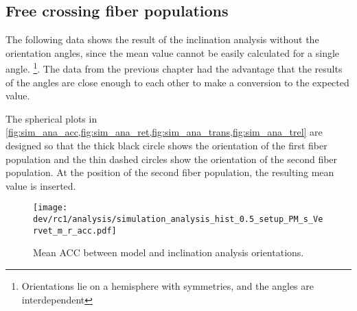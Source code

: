 \subsection{Free crossing fiber populations}
\label{sec:resFreeCross}
%
The following data shows the result of the inclination analysis without the orientation angles, since the mean value cannot be easily calculated for a single angle. \footnote{Orientations lie on a hemisphere with symmetries, and the angles are interdependent}.
The data from the previous chapter had the advantage that the results of the angles are close enough to each other to make a conversion to the expected value.
\par
%
The spherical plots in \cref{fig:sim_ana_acc,fig:sim_ana_ret,fig:sim_ana_trans,fig:sim_ana_trel} are designed so that the thick black circle shows the orientation of the first fiber population and the thin dashed circles show the orientation of the second fiber population.
At the position of the second fiber population, the resulting mean value is inserted.
%
%
%
\begin{figure}[!p]
\centering
\texttt{[image: dev/rc1/analysis/simulation\_analysis\_hist\_0.5\_setup\_PM\_s\_Vervet\_m\_r\_acc.pdf]}
\caption{Mean \ac{ACC} between model and inclination analysis orientations. }
\label{fig:sim_ana_acc}
\end{figure}
%
